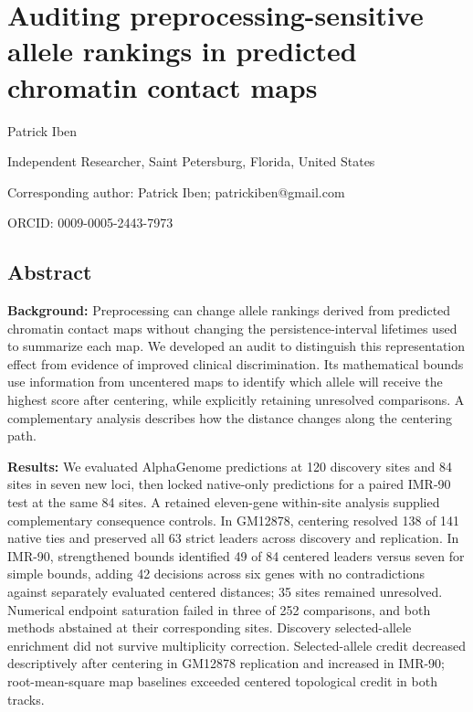 \documentclass[
  11pt,
]{article}
\author{}
\date{}
\begin{document}
\section{Auditing preprocessing-sensitive allele rankings in predicted
chromatin contact
maps}\label{auditing-preprocessing-sensitive-allele-rankings-in-predicted-chromatin-contact-maps}

Patrick Iben

Independent Researcher, Saint Petersburg, Florida, United States

Corresponding author: Patrick Iben; patrickiben@gmail.com

ORCID: 0009-0005-2443-7973

\subsection{Abstract}\label{abstract}

\textbf{Background:} Preprocessing can change allele rankings derived
from predicted chromatin contact maps without changing the
persistence-interval lifetimes used to summarize each map. We developed
an audit to distinguish this representation effect from evidence of
improved clinical discrimination. Its mathematical bounds use
information from uncentered maps to identify which allele will receive
the highest score after centering, while explicitly retaining unresolved
comparisons. A complementary analysis describes how the distance changes
along the centering path.

\textbf{Results:} We evaluated AlphaGenome predictions at 120 discovery
sites and 84 sites in seven new loci, then locked native-only
predictions for a paired IMR-90 test at the same 84 sites. A retained
eleven-gene within-site analysis supplied complementary consequence
controls. In GM12878, centering resolved 138 of 141 native ties and
preserved all 63 strict leaders across discovery and replication. In
IMR-90, strengthened bounds identified 49 of 84 centered leaders versus
seven for simple bounds, adding 42 decisions across six genes with no
contradictions against separately evaluated centered distances; 35 sites
remained unresolved. Numerical endpoint saturation failed in three of
252 comparisons, and both methods abstained at their corresponding
sites. Discovery selected-allele enrichment did not survive multiplicity
correction. Selected-allele credit decreased descriptively after
centering in GM12878 replication and increased in IMR-90;
root-mean-square map baselines exceeded centered topological credit in
both tracks.
\end{document}
